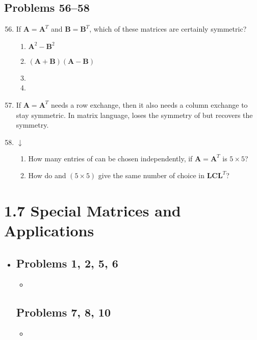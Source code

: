 \begin{itemize}
\begin{enumerate}
    \end{enumerate}

    \subsection{Problems 56--58}
    \begin{enumerate}\setcounter{enumi}{55}\color{foreground-2}
      \item If \( \bm{A} = \bm{A}^T \) and \( \bm{B} = \bm{B}^T \), which of
        these matrices are certainly symmetric?
        \begin{enumerate}
          \item \( \bm{A}^2 - \bm{B}^2 \)
          \item \( (\bm{A}+\bm{B})(\bm{A}-\bm{B}) \)
          \item {}
          \item {}
        \end{enumerate}

      \item If \(\bm{A} = \bm{A}^T\) needs a row exchange, then it also needs a
        column exchange to stay symmetric. In matrix language,  loses the
        symmetry of  but  recovers the symmetry.

      \item \( \downarrow \)
         \begin{enumerate}
           \item How many entries of  can be chosen independently, if \(
             \bm{A} = \bm{A}^T \) is \( 5 \times 5 \)?
           \item How do  and  \( (5 \times 5) \) give the same
             number of choice in \( \bm{LCL}^T \)?
        \end{enumerate}

    \end{enumerate}

\end{itemize}

\section{1.7 Special Matrices and Applications}
\begin{itemize}
  \item []

    \subsection{Problems 1, 2, 5, 6}
    \begin{itemize}
      \item
    \end{itemize}

    \subsection{Problems 7, 8, 10}
    \begin{itemize}
      \item
    \end{itemize}

\end{itemize}
